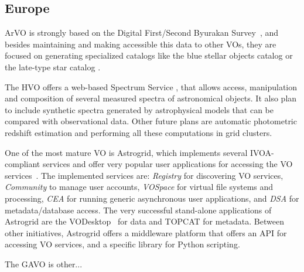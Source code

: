 \subsection{Europe}

ArVO is strongly based on the Digital First/Second Byurakan 
Survey~\cite{}, 
and besides maintaining and making accessible this data to other VOs,
they are focused on generating specialized catalogs like the
blue stellar objects catalog or the late-type star catalog \cite{}.

The HVO offers a web-based Spectrum Service \cite{},
that allows access, manipulation and composition of
several measured spectra of astronomical objects. It
also plan to include synthetic spectra generated by
astrophysical models that can be compared with observational
data. Other future plans are automatic photometric redshift 
estimation and performing all these computations in grid clusters. 

One of the most mature VO is Astrogrid, which implements
several IVOA-compliant services and offer very popular user applications
for accessing the VO services~\cite{}.
The implemented services are: \emph{Registry}
for discovering VO services, \emph{Community} to manage user accounts, 
\emph{VOSpace} for virtual file systems and processing, \emph{CEA} for running
generic asynchronous user applications, and \emph{DSA} for metadata/database
access. The very successful stand-alone applications of Astrogrid are 
the VODesktop~\cite{} for data and
TOPCAT \cite{} for metadata.
Between other initiatives, Astrogrid offers a middleware platform 
that offers an API for accessing VO services, and a specific 
library for Python scripting.


The GAVO is other...


